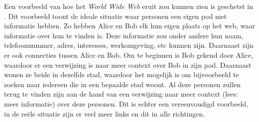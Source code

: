 Een voorbeeld van hoe het \textit{World Wide Web} eruit zou kunnen zien is geschetst in . Dit voorbeeld toont de ideale situatie waar personen een eigen pod met informatie hebben. Zo hebben Alice en Bob elk hun eigen plaats op het web, waar informatie over hun te vinden is. Deze informatie zou onder andere hun naam, telefoonnummer, adres, interesses, werkomgeving, etc kunnen zijn. Daarnaast zijn er ook connecties tussen Alice en Bob. Om te beginnen is Bob gekend door Alice, waardoor er een verwijzing is naar meer context over Bob in zijn pod. Daarnaast wonen ze beide in dezelfde stad, waardoor het mogelijk is om bijvoorbeeld te zoeken naar iedereen die in een bepaalde stad woont. Al deze personen zullen terug te vinden zijn aan de hand van een verwijzing naar meer context (lees: meer informatie) over deze personen. Dit is echter een vereenvoudigd voorbeeld, in de reële situatie zijn er veel meer links en dit in alle richtingen.